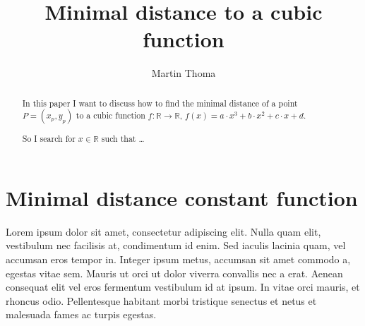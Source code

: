 \documentclass[a4paper]{scrartcl}
\title{Minimal distance to a cubic function}
\author{Martin Thoma}
\begin{document}
\maketitle
\begin{abstract}
In this paper I want to discuss how to find the minimal distance of a
point $P = (x_p, y_p)$ to a cubic function $f: \mathbb{R} \rightarrow \mathbb{R}$,
$f(x) = a \cdot x^3 + b \cdot x^2 + c \cdot x + d$.

So I search for $x \in \mathbb{R}$ such that \dots
\end{abstract}

\section{Minimal distance constant function}
Lorem ipsum dolor sit amet, consectetur adipiscing elit. Nulla
quam elit, vestibulum nec facilisis at, condimentum id enim. Sed
iaculis lacinia quam, vel accumsan eros tempor in. Integer ipsum
metus, accumsan sit amet commodo a, egestas vitae sem. Mauris ut
orci ut dolor viverra convallis nec a erat. Aenean consequat elit
vel eros fermentum vestibulum id at ipsum. In vitae orci mauris, et
rhoncus odio. Pellentesque habitant morbi tristique senectus et netus
et malesuada fames ac turpis egestas.
\end{document}
